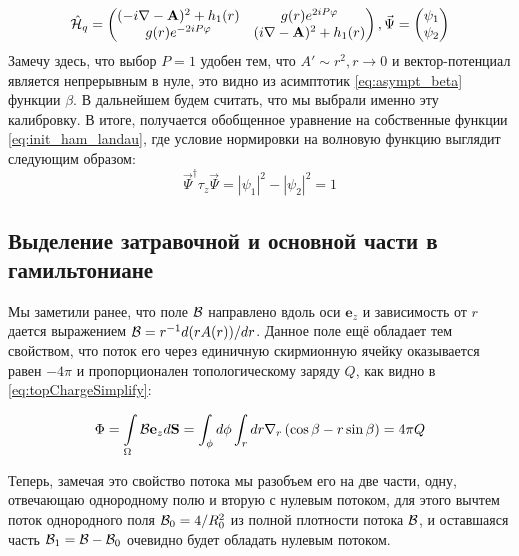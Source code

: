 \documentclass[a4paper,article,14pt]{extarticle}
\begin{document}
$$
\hat {\cal H}_{q} =\begin{pmatrix} (- i \nabla - \mathbf{A} ) ^ 2 + h_1 (r) &  g (r) e^{2 i P \varphi} \\  g (r) e^{-2 i P \varphi}   & ( i \nabla - \mathbf{A} ) ^ 2 + h_1 (r) \end{pmatrix}, \vec{\Psi} = \begin{pmatrix}  \psi_1 \\ \psi_2 \end{pmatrix}
$$
Замечу здесь, что выбор $P=1$ удобен тем, что $A' \sim r^2, r \rightarrow 0$ и вектор-потенциал является непрерывным в нуле, это видно из асимптотик \eqref{eq:asympt_beta} функции $\beta$. В дальнейшем будем считать, что мы выбрали именно эту калибровку. В итоге, получается обобщенное уравнение на собственные функции \eqref{eq:init_ham_landau}, где условие нормировки на волновую функцию выглядит следующим образом:
$$
\vec{\Psi}^\dagger \tau_z \vec{\Psi} =|\psi_1|^2-|\psi_2|^2=1
$$


\subsection{ Выделение затравочной и основной части в гамильтониане }

Мы заметили ранее, что поле $\cal B$ направлено вдоль оси $\mathbf{e}_z$ и зависимость от $r$ дается выражением  ${\cal B} = r^{-1} d(r A(r))/dr$. Данное поле ещё обладает тем свойством, что поток его через единичную скирмионную ячейку оказывается равен $ -4\pi $ и пропорционален топологическому заряду  $Q$, как видно в \eqref{eq:topChargeSimplify}:

\begin{equation}
\Phi = \int \limits_\Omega {\cal B} \mathbf{e}_z d\mathbf{S} = \int_\phi d \phi \int_r d r \nabla_r \left(\cos\beta   -  r  \sin \beta \right)  = 4 \pi Q
\end{equation}

Теперь, замечая это свойство потока мы разобъем его на две части, одну, отвечающаю однородному полю и вторую с нулевым потоком, для этого вычтем поток однородного поля ${\cal B}_{0} = 4/R_{0}^{2}$  из полной плотности потока  $\cal B$, и оставшаяся часть ${\cal B}_{1} = {\cal B} - {\cal B}_{0}$ очевидно будет обладать нулевым потоком.
 
\end{document}
